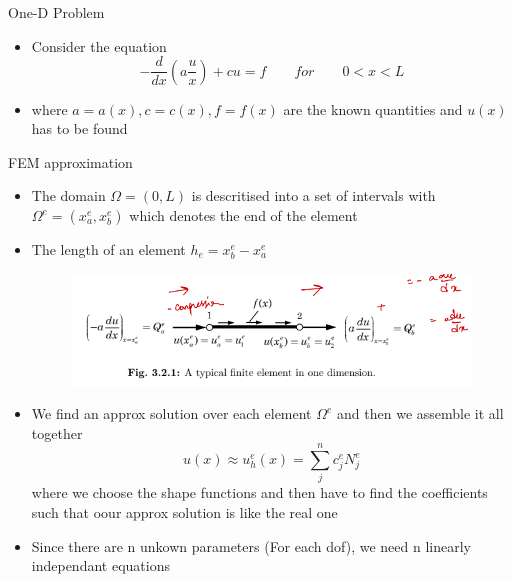 	\begin{frame}{One-D Problem}
		\begin{itemize}
			\item Consider the equation
			\begin{equation}
				-\frac{d}{dx}\left(a \frac{u}{x} \right) + cu =  f \qquad for \qquad 0<x<L
			\end{equation}
			\item where $a = a(x), c = c(x), f = f(x)$ are the known quantities and $u(x)$ has to be found		
		\end{itemize}
	\end{frame}


	\begin{frame}{FEM approximation}
		\begin{itemize}
			\item The domain $\Omega = (0,L)$ is descritised into a set of intervals with $\Omega^e = (x_a^e,x_b^e)$ which denotes the end of the element 
			\item  The length of an element $h_e =x_b^e- x_a^e$
			\begin{figure}
				\centering
				\includegraphics[width=0.7\linewidth]{Figure/fig1} 
			\end{figure}
			\item We find an approx solution over each element $\Omega^e$ and then we assemble it all together
			\begin{equation}
			u(x) \approx u_h^e(x) = \sum_{j}^{n}c^e_jN_j^e
			\end{equation}
			where we choose the shape functions and then have to find the coefficients such that oour approx solution is like the real one
			\item Since there are n unkown parameters (For each dof), we need n linearly independant equations

		\end{itemize}
	\end{frame}



